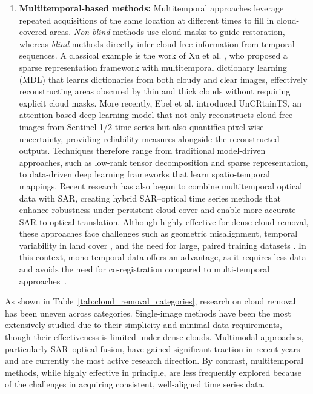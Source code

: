 \begin{enumerate}[label=(\Alph*)]
  \item \textbf{Multitemporal-based methods:} Multitemporal approaches leverage repeated acquisitions of the same location at different times to fill in cloud-covered areas. \textit{Non-blind} methods use cloud masks to guide restoration, whereas \textit{blind} methods directly infer cloud-free information from temporal sequences. A classical example is the work of Xu et al. \cite{CR_spars_repre_MT_dict_L}, who proposed a sparse representation framework with multitemporal dictionary learning (MDL) that learns dictionaries from both cloudy and clear images, effectively reconstructing areas obscured by thin and thick clouds without requiring explicit cloud masks. More recently, Ebel et al. \cite{UnCRtainTS} introduced UnCRtainTS, an attention-based deep learning model that not only reconstructs cloud-free images from Sentinel-1/2 time series but also quantifies pixel-wise uncertainty, providing reliability measures alongside the reconstructed outputs. Techniques therefore range from traditional model-driven approaches, such as low-rank tensor decomposition and sparse representation, to data-driven deep learning frameworks that learn spatio-temporal mappings. Recent research has also begun to combine multitemporal optical data with SAR, creating hybrid SAR–optical time series methods that enhance robustness under persistent cloud cover and enable more accurate SAR-to-optical translation. Although highly effective for dense cloud removal, these approaches face challenges such as geometric misalignment, temporal variability in land cover \cite{expl_ML_CR_Cameroon}, and the need for large, paired training datasets \cite{CR_Advances_Review_ORS}. In this context, mono-temporal data offers an advantage, as it requires less data and avoids the need for co-registration compared to multi-temporal approaches~\cite{kiwa_auto_Delineation_BAs}.

\end{enumerate}

As shown in Table~\ref{tab:cloud_removal_categories}, research on cloud removal has been uneven across categories. Single-image methods have been the most extensively studied due to their simplicity and minimal data requirements, though their effectiveness is limited under dense clouds. Multimodal approaches, particularly SAR–optical fusion, have gained significant traction in recent years and are currently the most active research direction. By contrast, multitemporal methods, while highly effective in principle, are less frequently explored because of the challenges in acquiring consistent, well-aligned time series data.

